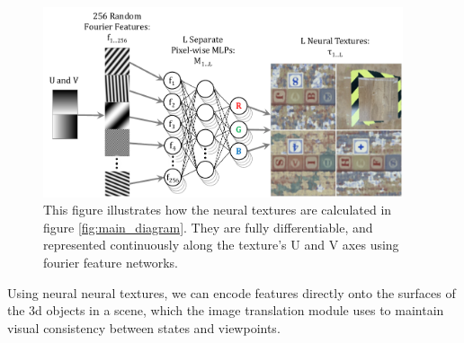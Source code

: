 \documentclass{article}
\begin{document}
	\begin{figure}[H]
		\begin{center}
			\includegraphics[width=300pt]{../images/learnable_textures.pdf}
		\end{center}
		\caption{
			This figure illustrates how the neural textures are calculated in figure \ref{fig:main_diagram}. They are fully differentiable, and represented continuously along the texture's U and V axes using fourier feature networks.
		}
		\label{fig:learnable_textures}
	\end{figure}



	Using neural neural textures, we can encode features directly onto the surfaces of the 3d objects in a scene, which the image translation module uses to maintain visual consistency between states and viewpoints.
\end{document}
